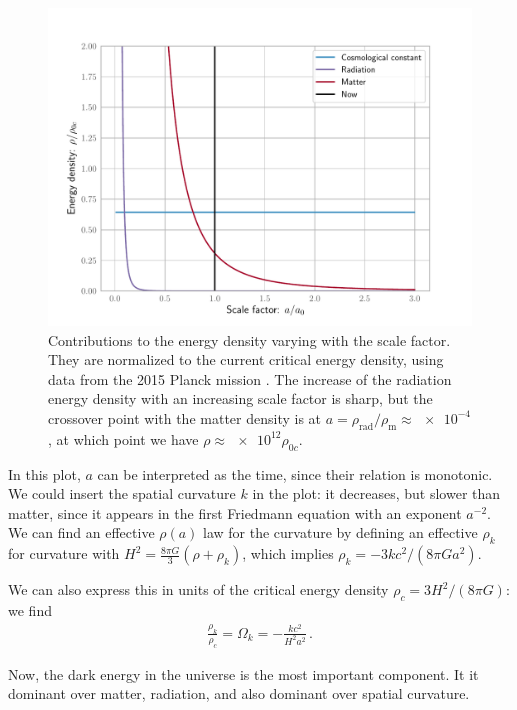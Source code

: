 \documentclass[main.tex]{subfiles}
\begin{document}
\begin{figure}[ht]
\centering
\includegraphics[width=\textwidth]{figures/global_energy_contributions.pdf}
\caption{Contributions to the energy density varying with the scale factor. They are normalized to the current critical energy density, using data from the 2015 Planck mission \cite{PlanckCollaboration:2016XIII}. The increase of the radiation energy density with an increasing scale factor is sharp, but the crossover point with the matter density is at \(a = \rho_{\text{rad}}/\rho_{\text{m}} \approx \num{e-4}\), at which point we have \(\rho \approx \num{e12} \rho_{0c}\).}
\label{fig:global_energy_contributions}
\end{figure}

In this plot, \(a\) can be interpreted as the time, since their relation is monotonic.
We could insert the spatial curvature \(k\) in the plot: it decreases, but slower than matter, since it appears in the first Friedmann equation with an exponent \(a^{-2}\).
We can find an effective \(\rho (a)\) law for the curvature by defining an effective \(\rho_{k}\) for curvature with \(H^2 = \frac{8 \pi G}{3} (\rho + \rho_{k})\), which implies \(\rho_{k} = - 3 k c^2 / (8 \pi G a^2)\). 

We can also express this in units of the critical energy density \(\rho_{c} = 3 H^2 / (8 \pi G)\): we find 
%
\begin{align} \label{eq:spatial-curvature-effective-density}
\frac{\rho_{k}}{\rho_{c}} = \Omega_{k} = - \frac{kc^2}{H^2a^2}
\,.
\end{align}

Now, the dark energy in the universe is the most important component. It it dominant over matter, radiation, and also dominant over spatial curvature.
\end{document}
